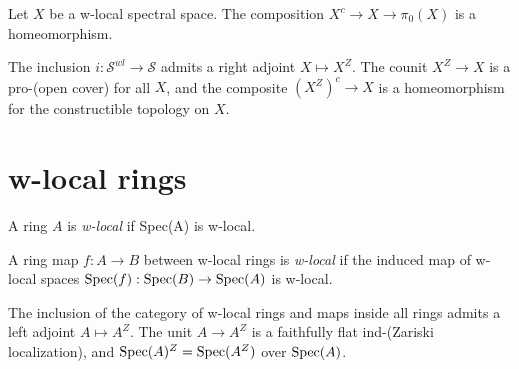 
\begin{lemma}
    \label{lem:w-local-space-connected-components}

    Let $X$ be a w-local spectral space. The composition $X^c \to X \to \pi_0(X)$ is a homeomorphism.
\end{lemma}

\begin{definition}
    \label{def:w-localization-space}
    The inclusion $i : \mathcal{S}^{wl} \to \mathcal{S}$ admits a right adjoint $X \mapsto X^Z$. The counit $X^Z \to X$ is a pro-(open cover) for all $X$, and the composite $(X^Z)^c \to X$ is a homeomorphism for the constructible topology on $X$.
\end{definition}

\section{w-local rings}

\begin{definition}
    A ring \(A\) is \emph{w-local} if Spec(A) is w-local.
    \label{def:w-local-ring}
\end{definition}

\begin{definition}
    A ring map \(f: A \to B\) between w-local rings is \emph{w-local} if the induced map of w-local spaces \(\operatorname{Spec}(f) : \operatorname{Spec}(B) \to \operatorname{Spec}(A)\) is w-local.
    \label{def:w-local-ring-map}
\end{definition}

\begin{definition}
    \label{def:w-localization-ring}
    The inclusion of the category of w-local rings and maps inside all rings admits a left adjoint $A \mapsto A^Z$. The unit $A \to A^Z$ is a faithfully flat ind-(Zariski localization), and $\operatorname{Spec}(A)^Z = \operatorname{Spec}(A^Z)$ over $\operatorname{Spec}(A)$.
\end{definition}

